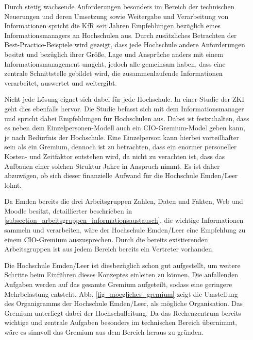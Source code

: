 Durch stetig wachsende Anforderungen besonders im Bereich der technischen Neuerungen und deren Umsetzung sowie Weitergabe und Verarbeitung von Informationen spricht die KfR seit Jahren Empfehlungen bezüglich eines Informationsmanagers an Hochschulen aus. Durch zusätzliches Betrachten der Best-Practice-Beispiele wird gezeigt, dass jede Hochschule andere Anforderungen besitzt und bezüglich ihrer Größe, Lage und Ansprüche anders mit einem Informationsmanagement umgeht, jedoch alle gemeinsam haben, dass eine zentrale Schnittstelle gebildet wird, die zusammenlaufende Informationen verarbeitet, auswertet und weitergibt.

Nicht jede Lösung eignet sich dabei für jede Hochschule. In einer Studie der ZKI geht dies ebenfalls hervor. Die Studie befasst sich mit dem Informationsmanager und spricht dabei Empfehlungen für Hochschulen aus. Dabei ist festzuhalten, dass es neben dem Einzelpersonen-Modell auch ein CIO-Gremium-Model geben kann, je nach Bedürfnis der Hochschule. Eine Einzelperson kann hierbei vorteilhafter sein als ein Gremium, dennoch ist zu betrachten, dass ein enormer personeller Kosten- und Zeitfaktor entstehen wird, da nicht zu verachten ist, dass das Aufbauen einer solchen Struktur Jahre in Anspruch nimmt. Es ist daher abzuwägen, ob sich dieser finanzielle Aufwand für die Hochschule Emden/Leer lohnt.

Da Emden bereits die drei Arbeitsgruppen Zahlen, Daten und Fakten, Web und Moodle besitzt, detaillierter beschrieben in \ref{subsection_arbeitsgruppen_informationsaustausch}, die wichtige Informationen sammeln und verarbeiten, wäre der Hochschule Emden/Leer eine Empfehlung zu einem CIO-Gremium auszusprechen. Durch die bereits existierenden Arbeitsgruppen ist aus jedem Bereich bereits ein Vertreter vorhanden. 

Die Hochschule Emden/Leer ist diesbezüglich schon gut aufgestellt, um weitere Schritte beim Einführen dieses Konzeptes einleiten zu können. Die anfallenden Aufgaben werden auf das gesamte Gremium aufgeteilt, sodass eine geringere Mehrbelastung entsteht. Abb. \ref{fig_moegliches_gremium} zeigt die Umstellung des Organigramms der Hochschule Emden/Leer, als mögliche Organisation. Das Gremium unterliegt dabei der Hochschulleitung. Da das Rechenzentrum bereits wichtige und zentrale Aufgaben besonders im technischen Bereich übernimmt, wäre es sinnvoll das Gremium aus dem Bereich heraus zu gründen. 

